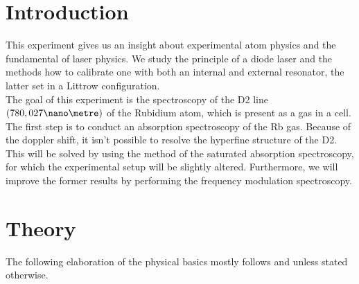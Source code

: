 
\section{Introduction}
This experiment gives us an insight about experimental atom physics and the fundamental of laser physics. We study the principle of a diode laser and the methods how to calibrate one with both an internal and external resonator, the latter set in a Littrow configuration.\\
The goal of this experiment is the spectroscopy of the D2 line $(780,027 \nano\metre)$ of the Rubidium atom, which is present as a gas in a cell.\\
The first step is to conduct an absorption spectroscopy of the Rb gas. Because of the doppler shift, it isn't possible to resolve the hyperfine structure of the D2. This will be solved by using the method of the saturated absorption spectroscopy, for which the experimental setup will be slightly altered. Furthermore, we will improve the former results by performing the frequency modulation spectroscopy.
\section{Theory}
The following elaboration of the physical basics mostly follows \cite{lit:AK_manual2012} and \cite{lit:SAS} unless stated otherwise.
